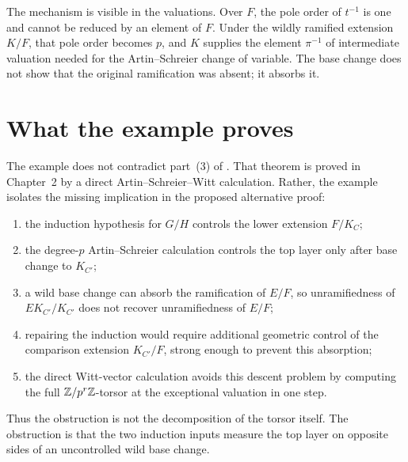 The mechanism is visible in the valuations. Over $F$, the pole order of
$t^{-1}$ is one and cannot be reduced by an element of $F$. Under the wildly
ramified extension $K/F$, that pole order becomes $p$, and $K$ supplies the
element $\pi^{-1}$ of intermediate valuation needed for the
Artin--Schreier change of variable. The base change does not show that the
original ramification was absent; it absorbs it.


\section{What the example proves}
\label{sec:as_induction_takeaway}

The example does not contradict part~(3) of
. That theorem is proved in Chapter~2
by a direct Artin--Schreier--Witt calculation. Rather, the example isolates
the missing implication in the proposed alternative proof:
\begin{enumerate}
  \item the induction hypothesis for $G/H$ controls the lower extension
        $F/K_C$;
  \item the degree-$p$ Artin--Schreier calculation controls the top layer
        only after base change to $K_{C'}$;
  \item a wild base change can absorb the ramification of $E/F$, so
        unramifiedness of $EK_{C'}/K_{C'}$ does not recover unramifiedness of
        $E/F$;
  \item repairing the induction would require additional geometric control
        of the comparison extension $K_{C'}/F$, strong enough to prevent
        this absorption;
  \item the direct Witt-vector calculation avoids this descent problem by
        computing the full $\mathbb{Z}/p^r\mathbb{Z}$-torsor at the exceptional valuation in
        one step.
\end{enumerate}

Thus the obstruction is not the decomposition of the torsor itself. The
obstruction is that the two induction inputs measure the top layer on opposite
sides of an uncontrolled wild base change.
